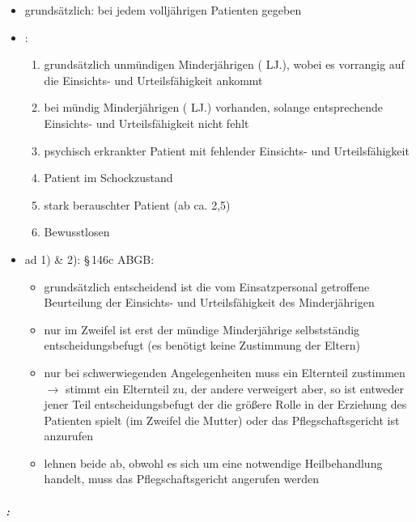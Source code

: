 {\begin{itemize}
  \item grundsätzlich: bei jedem volljährigen Patienten gegeben
  \item {}:
  \begin{enumerate}
    \item grundsätzlich unmündigen Minderjährigen ( LJ.), wobei es
    vorrangig auf die Einsichts- und Urteilsfähigkeit ankommt
    \item bei mündig Minderjährigen ( LJ.) vorhanden, solange
    entsprechende Einsichts- und Urteilsfähigkeit nicht fehlt
    \item psychisch erkrankter Patient mit fehlender Einsichts- und Urteilsfähigkeit
    \item Patient im Schockzustand 
    \item stark berauschter Patient (ab ca. 2,5{\textperthousand})
    \item Bewusstlosen
  \end{enumerate}
  \item[] ad 1) \& 2): {\S}\,146c ABGB:
  \begin{itemize}
    \item grundsätzlich entscheidend ist die vom Einsatzpersonal getroffene
    Beurteilung der Einsichts- und Urteilsfähigkeit des Minderjährigen
    \item nur im Zweifel ist erst der mündige Minderjährige selbstständig
    entscheidungsbefugt (es benötigt keine Zustimmung der Eltern)
    \item nur bei schwerwiegenden Angelegenheiten muss ein Elternteil zustimmen
    ${\rightarrow}$ stimmt ein Elternteil zu, der andere verweigert aber,
    so ist  entweder jener Teil entscheidungsbefugt der die größere
    Rolle in der Erziehung des Patienten spielt (im Zweifel
    die Mutter) oder das Pflegschaftsgericht ist anzurufen
    \item lehnen beide ab, obwohl es sich um eine notwendige Heilbehandlung handelt, muss das
    Pflegschaftsgericht angerufen werden
  \end{itemize}
\end{itemize}

\subparagraph{:}

}
